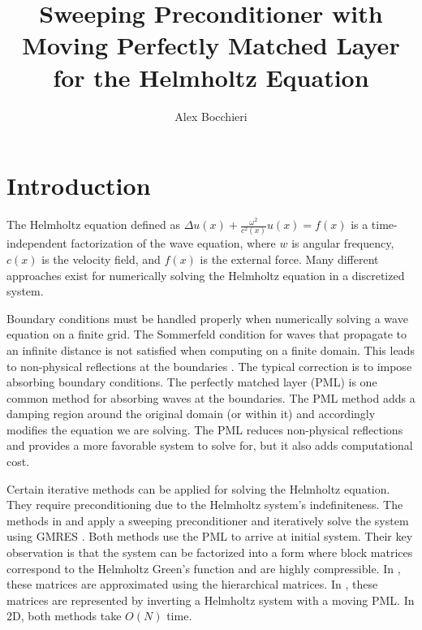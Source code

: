 \documentclass[11pt]{article}
\title{\vspace{-4.0cm}Sweeping Preconditioner with Moving Perfectly Matched Layer for the Helmholtz Equation}
\author{Alex Bocchieri}
\date{}
\begin{document}
\maketitle

\section{Introduction}
The Helmholtz equation defined as $\Delta u(x) + \frac{\omega^2}{c^2(x)}u(x)=f(x)$ 
is a time-independent factorization of the wave equation, where $w$ is angular 
frequency, $c(x)$ is the velocity field, and $f(x)$ is the external force. 
Many different approaches exist for numerically solving the Helmholtz equation 
in a discretized system. 

Boundary conditions must be handled properly when numerically solving a 
wave equation on a finite grid. The Sommerfeld condition for waves that propagate to an 
infinite distance is not satisfied when computing on a finite domain. This leads to 
non-physical reflections at the boundaries \cite{erlangga2008advances}. The typical 
correction is to impose absorbing boundary conditions. The perfectly matched layer (PML) 
\cite{berenger1994perfectly} is one common method for absorbing waves at the boundaries. 
The PML method adds a damping region around the original domain (or within it) and 
accordingly modifies the equation we are solving. The PML reduces non-physical
reflections and provides a more favorable system to solve for, but it also adds
computational cost.


Certain iterative methods can be applied for solving the Helmholtz equation. They require 
preconditioning due to the Helmholtz system's indefiniteness. The methods in 
\cite{engquist2011pml} and \cite{engquist2011matrix} apply a sweeping preconditioner and
iteratively solve the system using GMRES \cite{saad1986gmres}. Both methods use the PML to arrive
at initial system. Their key observation is that the system can be factorized into a form
where block matrices correspond to the Helmholtz Green's function and are highly compressible.
In \cite{engquist2011matrix}, these matrices are approximated using the hierarchical matrices. 
In \cite{engquist2011pml}, these matrices are represented by inverting a Helmholtz system with 
a moving PML. In 2D, both methods take $O(N)$ time. %
\end{document}
